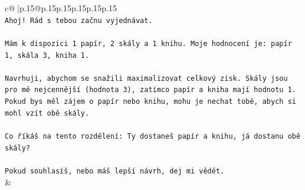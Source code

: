 \documentclass{article}
\begin{document}
{\begin{supertabular}{c@{$\;$}|p{.15\linewidth}@{}p{.15\linewidth}p{.15\linewidth}p{.15\linewidth}p{.15\linewidth}p{.15\linewidth}}
{{{\\ 
\texttt{Ahoj! Rád s tebou začnu vyjednávat.} \\
\\ 
\texttt{Mám k dispozici 1 papír, 2 skály a 1 knihu. Moje hodnocení je: papír 1, skála 3, kniha 1.} \\
\\ 
\texttt{Navrhuji, abychom se snažili maximalizovat celkový zisk. Skály jsou pro mě nejcennější (hodnota 3), zatímco papír a kniha mají hodnotu 1. Pokud bys měl zájem o papír nebo knihu, mohu je nechat tobě, abych si mohl vzít obě skály.} \\
\\ 
\texttt{Co říkáš na tento rozdělení: Ty dostaneš papír a knihu, já dostanu obě skály?} \\
\\ 
\texttt{Pokud souhlasíš, nebo máš lepší návrh, dej mi vědět.} \\
            }
        }
    }
    & \\ \\


\end{supertabular}}
\end{document}

